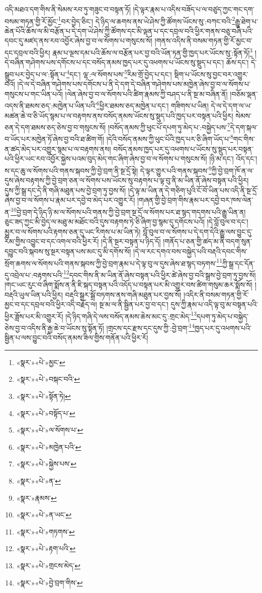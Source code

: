 འདི་མཐའ་དག་གིས་ནི་སེམས་རབ་ཏུ་གཟུང་བ་བསྟན་ཏོ། །དེ་ལྟར་རྣམ་པ་འདིས་བཟོད་པ་ལ་བཙུད་ཀྱང་གང་དག་བསམ་གཏན་གྱི་རོ་མྱོང་\footnote{«སྣར་»«པེ་»མྱང་}བར་བྱེད་ཅིང་། དེ་ཉིད་ལ་ཆགས་ནས་ཡེ་ཤེས་ཀྱི་ཚོགས་ཡོངས་སུ་:བཀང་བའི་\footnote{«སྣར་»«པེ་»བསྐང་བའི་}རྒྱུ་ཐེག་པ་ཆེན་པོའི་ཆོས་ལ་མི་བརྩོན་པ་དེ་དག་ཡེ་ཤེས་ཀྱི་ཚོགས་དང་མི་ལྡན་པ་དང་དབྲལ་བའི་ཕྱིར་གནས་བཅུ་བཞི་པའི་དབང་དུ་མཛད་ནས་རབ་འབྱོར་ཞེས་བྱ་བ་ལ་སོགས་པ་གསུངས་སོ། །གནས་འདིས་ནི་བསམ་གཏན་གྱི་རོ་མྱང་བ་དང་དབྲལ་བའི་ཕྱིར། རྣམ་པ་ལྔས་དམ་པའི་ཆོས་ལ་བརྩོན་པར་བྱ་བའི་ཡོན་ཏན་གྱི་ཁྱད་པར་ཡོངས་སུ་:སྟོན་ཏོ།\footnote{«སྣར་»«པེ་»སྟོན་ཏེ།} །དེ་བཞིན་གཤེགས་པས་དགོངས་པ་དང་བསོད་ནམས་ཁྱད་པར་དུ་འཕགས་པ་ཡོངས་སུ་སྡུད་པ་དང་། ཆོས་དང་། དེ་སྒྲུབ་པར་བྱེད་པ་ལ་:སྟོན་པ་\footnote{«སྣར་»«པེ་»བསྟོད་པ་}དང་། ལྷ་:ལ་སོགས་པས་\footnote{«སྣར་»«པེ་»ལ་སོགས་པ་}རིམ་གྲོ་བྱེད་པ་དང་། སྡིག་པ་ཡོངས་སུ་བྱང་བར་འགྱུར་བའོ། །དེ་ལ་དེ་བཞིན་གཤེགས་པས་དགོངས་པ་ནི་དེ་དག་དེ་བཞིན་གཤེགས་པས་མཁྱེན་ཞེས་བྱ་བ་ལ་སོགས་པ་གསུངས་པ་གང་ཡིན་པའོ། །ལེན་ཞེས་བྱ་བ་ལ་སོགས་པའི་ཚིག་རྣམས་ཀྱི་བཤད་པ་ནི་སྔ་མ་བཞིན་ནོ། །བཅོམ་ལྡན་འདས་ནི་ཐམས་ཅད་:མཁྱེན་པ་ཡིན་པའི་\footnote{«སྣར་»«པེ་»མཁྱེན་པའི་}ཕྱིར་ཐམས་ཅད་མཁྱེན་པ་དང་། གཟིགས་པ་ཡིན། དེ་ལ་དེ་དག་ལ་ཡ་མཚན་ཆེ་བ་ཅི་ཡོད་སྙམ་པ་ལ་བརྟགས་ནས་བསོད་ནམས་ཡོངས་སུ་སྡུད་པའི་ཁྱད་པར་བསྟན་པའི་ཕྱིར། སེམས་ཅན་དེ་དག་ཐམས་ཅད་ཅེས་བྱ་བ་གསུངས་སོ། །བསོད་ནམས་ཀྱི་ཕུང་པོ་དཔག་ཏུ་མེད་པ་:བསྐྱེད་པས་\footnote{«སྣར་»«པེ་»སྐྱེས་པས་}དེ་དག་སྐལ་བ་ཡོད་པར་མཁྱེན་ཏོ་ཞེས་བྱ་བའི་ཐ་ཚིག་གོ། །དེའི་བསོད་ནམས་ཀྱི་ཕུང་པོའི་ཁྱད་པར་ཅི་ཞིག་ཡོད་པ་\footnote{«སྣར་»«པེ་»ན་}གང་གིས་ན་ཚད་མེད་པར་འགྱུར་སྙམ་པ་ལ་བརྟགས་ནས། བསོད་ནམས་ཁྱད་པར་དུ་འཕགས་པ་ཡོངས་སུ་སྡུད་པར་བསྟན་པའི་ཕྱིར་ཡང་རབ་འབྱོར་སྐྱེས་པའམ་བུད་མེད་གང་ཞིག་ཞེས་བྱ་བ་ལ་སོགས་པ་གསུངས་སོ། །ཉི་མ་དང་། འོད་དང་། ས་དང་ཆུ་ལ་སོགས་པའི་གནས་སྐབས་ཀྱི་བྱེ་བྲག་ནི་སྔ་དྲོ་སྟེ། དེ་ལྟར་གྱུར་པའི་གནས་སྐབས་\footnote{«སྣར་»རྣམས་}ཀྱི་བྱེ་བྲག་ཁོ་ན་ལ་དུས་ཞེས་བརྟགས་ཀྱི་བྱེ་བྲག་ཅན་ལ་སོགས་པས་ཡོངས་སུ་བརྟགས་པ་ལྟ་བུ་ནི་མ་ཡིན་ནོ་ཞེས་བསྟན་པའི་ཕྱིར། དུས་ཀྱི་སྒྲ་དང་དེ་ནི་གཞི་མཐུན་པས་བྱེ་བྲག་ཏུ་བྱས་སོ། །དེ་ལྟ་མ་ཡིན་ན་དེ་གཅིག་པུའི་ངོ་བོ་ཡིན་པས་འདི་ནི་སྔ་དྲོ་ཞེས་བྱ་བ་ལ་སོགས་པ་རྣམ་པར་དབྱེ་བ་མེད་པར་འགྱུར་རོ། །གཞན་གྱི་བྱེ་བྲག་གིས་རྣམ་པར་དབྱེ་བར་ཁས་ལེན་ན་\footnote{«སྣར་»«པེ་»ན་ཡང་}བྱེ་བྲག་དེ་ཉིད་ཉི་མ་ལ་སོགས་པའི་གནས་ཀྱི་བྱེ་བྲག་སྔ་དྲོ་ལ་སོགས་པར་ཐ་སྙད་གདགས་པའི་རྒྱུ་ཡིན་ན། ཅུང་ཟད་ཀྱང་མི་བྱེད་ལ་མཐུ་མ་མཐོང་བའི་དུས་བརྟགས་ཏེ་ཅི་ཞིག་བྱ་སྙམ་དུ་དགོངས་པའོ། །དེ་བློ་བུལ་བ་དང་། མྱུར་བ་ལ་སོགས་པའི་རྟགས་ཅན་དུ་ཡང་རིགས་པ་མ་ཡིན་ཏེ། བློ་བུལ་བ་ལ་སོགས་པ་དེ་དག་དེའི་རྒྱུ་ལས་བྱུང་དུ་རིམ་གྱིས་འབྱུང་བ་དང་འགལ་བའི་ཕྱིར་རོ། །དེ་ནི་སྔར་བསྟན་པ་ཉིད་དོ། །གནོད་པ་ཅན་གྱི་ཚད་མ་ནི་བདག་སུན་དབྱུང་བའི་སྐབས་སུ་སྔར་བསྟན་པས་མང་དུ་མི་དགོས་སོ། །དེ་ལ་རང་དགའ་བས་བསྐྱེད་པའི་བརྡའི་དབང་གིས་སྲོག་ཆགས་ལ་སོགས་པའི་གནས་སྐབས་ཀྱི་བྱེ་བྲག་རྣམ་པ་དེ་ལྟ་བུ་ལ་དུས་ཞེས་ཐ་སྙད་བཏགས་\footnote{«སྣར་»«པེ་»གཏགས་}ཀྱི་སྒྲ་དང་དོན་དུ་འབྲེལ་པ་:བརྟགས་པའི་\footnote{«སྣར་»«པེ་»རྟག་པའི་}དབང་གིས་ནི་མ་ཡིན་ནོ་ཞེས་བསྟན་པའི་ཕྱིར་ཚེ་ཞེས་བྱ་བའི་སྒྲས་བྱེ་བྲག་ཏུ་བྱས་སོ། །གང་ཡང་རུང་བ་ཞིག་སྨོས་ན་ནི་ཇི་སྐད་བསྟན་པའི་འདོད་པ་བསྟན་པར་མི་འགྱུར་བས་ཚིག་གསུམ་ཆར་སྨོས་སོ། །བརྡའི་ཡུལ་ཡིན་པའི་ཕྱིར། བརྡའི་སྒྲར་སྒྲོ་བཏགས་ནས་གཞི་མཐུན་པར་བྱས་སོ། །འདིར་ནི་བསམ་གཏན་གྱི་རོ་མྱང་བ་དང་དབྲལ་བའི་ཕྱིར་འདི་བརྗོད་ལ། སྔ་མ་ལ་ནི་སྦྱིན་པར་བྱ་བ་དང་། དུས་ཀྱི་རྣམ་པ་འདི་ལྟ་བུ་མ་བསྟན་པའི་ཕྱིར་ཟློས་པར་མི་འགྱུར་རོ། །དེ་ཉིད་གཞི་དེ་ལས་བསོད་ནམས་ཆེས་མང་དུ་:གྲང་མེད་\footnote{«སྣར་»«པེ་»གྲངས་མེད་}དཔག་ཏུ་མེད་པ་བསྐྱེད་ཅེས་བྱ་བ་འདིས་ནི་རྒྱ་ཆེ་བ་ཡོངས་སུ་སྟོན་ཏོ། །གྲངས་དང་རྫས་དང་དུས་ཀྱི་:བྱེ་བྲག་\footnote{«སྣར་»«པེ་»བྱེ་བྲག་གིས་}ཁྱད་པར་དུ་འཕགས་པའི་སྦྱིན་པ་ལས་བྱུང་བའི་བསོད་ནམས་ཟིལ་གྱིས་གནོན་པའི་ཕྱིར་རོ། 